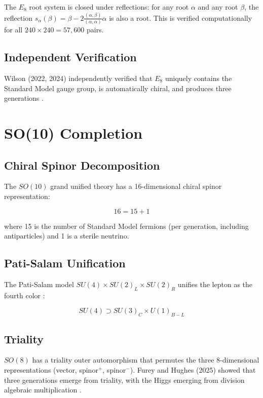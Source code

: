 \documentclass[11pt]{article}
\begin{document}
The $E_8$ root system is closed under reflections: for any root $\alpha$ and any root $\beta$, the reflection $s_\alpha(\beta) = \beta - 2\frac{(\alpha, \beta)}{(\alpha, \alpha)}\alpha$ is also a root. This is verified computationally for all $240 \times 240 = 57{,}600$ pairs.

\subsection{Independent Verification}

Wilson (2022, 2024) independently verified that $E_8$ uniquely contains the Standard Model gauge group, is automatically chiral, and produces three generations \cite{wilson2022e8, wilson2024e8}.

\section{SO(10) Completion}

\subsection{Chiral Spinor Decomposition}

The $SO(10)$ grand unified theory has a 16-dimensional chiral spinor representation:

\begin{equation}
16 = 15 + 1
\end{equation}

where 15 is the number of Standard Model fermions (per generation, including antiparticles) and 1 is a sterile neutrino.

\subsection{Pati-Salam Unification}

The Pati-Salam model $SU(4) \times SU(2)_L \times SU(2)_R$ unifies the lepton as the fourth color \cite{pati1974unity}:

\begin{equation}
SU(4) \supset SU(3)_C \times U(1)_{B-L}
\end{equation}

\subsection{Triality}

$SO(8)$ has a triality outer automorphism that permutes the three 8-dimensional representations (vector, spinor$^+$, spinor$^-$). Furey and Hughes (2025) showed that three generations emerge from triality, with the Higgs emerging from division algebraic multiplication \cite{furey2025generations}.
\end{document}
